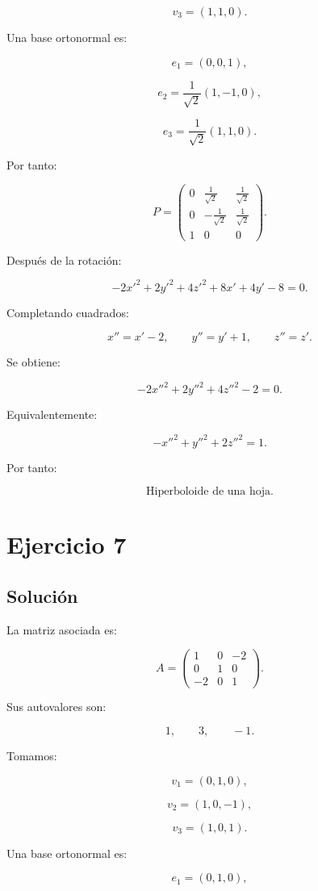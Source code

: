 \documentclass[11pt,a4paper]{article}
\begin{document}
\[
v_3=(1,1,0).
\]

Una base ortonormal es:

\[
e_1=(0,0,1),
\]

\[
e_2=
\frac1{\sqrt2}(1,-1,0),
\]

\[
e_3=
\frac1{\sqrt2}(1,1,0).
\]

Por tanto:

\[
P=
\begin{pmatrix}
0&\frac1{\sqrt2}&\frac1{\sqrt2}\\
0&-\frac1{\sqrt2}&\frac1{\sqrt2}\\
1&0&0
\end{pmatrix}.
\]

Después de la rotación:

\[
-2x'^2+2y'^2+4z'^2+8x'+4y'-8=0.
\]

Completando cuadrados:

\[
x''=x'-2,
\qquad
y''=y'+1,
\qquad
z''=z'.
\]

Se obtiene:

\[
\boxed{
-2x''^2+2y''^2+4z''^2-2=0.
}
\]

Equivalentemente:

\[
\boxed{
-x''^2+y''^2+2z''^2=1.
}
\]

Por tanto:

\[
\boxed{\text{Hiperboloide de una hoja}.}
\]

\section{Ejercicio 7}
\subsection{Solución}

La matriz asociada es:

\[
A=
\begin{pmatrix}
1&0&-2\\
0&1&0\\
-2&0&1
\end{pmatrix}.
\]

Sus autovalores son:

\[
1,\qquad3,\qquad-1.
\]

Tomamos:

\[
v_1=(0,1,0),
\]

\[
v_2=(1,0,-1),
\]

\[
v_3=(1,0,1).
\]

Una base ortonormal es:

\[
e_1=(0,1,0),
\]
\end{document}
